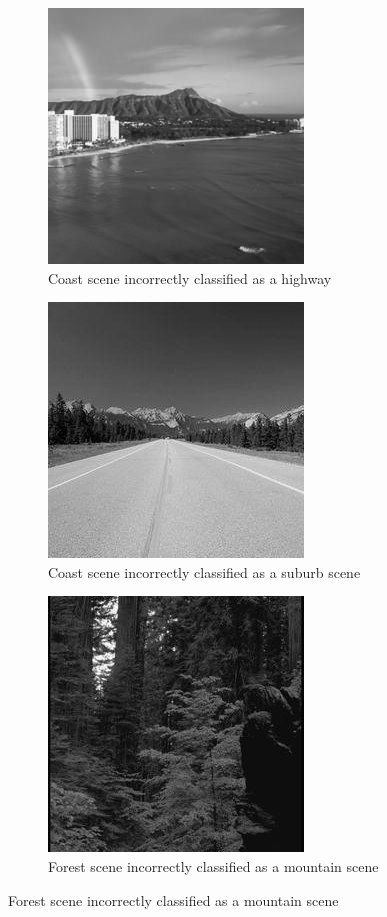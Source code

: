 \begin{homeworkProblem}
\begin{figure}[H]
  \centering
  \begin{subfigure}{0.5\textwidth}
    \caption{Coast scene incorrectly classified as a highway}
    \centering
    \includegraphics[width=.5\linewidth]{./images/0_high.jpg}
  \end{subfigure}%
  \begin{subfigure}{0.5\textwidth}
    \centering
    \caption{Coast scene incorrectly classified as a suburb scene}
    \includegraphics[width=.5\linewidth]{./images/0_surb.jpg}
  \end{subfigure}
  \begin{subfigure}{0.5\textwidth}
    \centering
    \caption{Forest scene incorrectly classified as a mountain scene}
    \includegraphics[width=.5\linewidth]{./images/1_mount.jpg}

\end{subfigure}
\end{figure}
\end{homeworkProblem}
